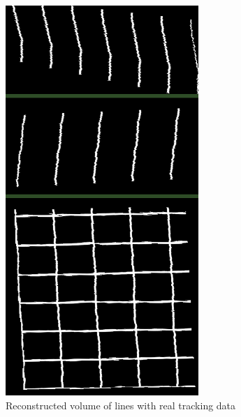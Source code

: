 \begin{figure}
\begin{minipage}[b]{0.49\textwidth}
	\includegraphics[width=0.652\textwidth]{graphics/large_lines.png}
	\caption{Reconstructed volume of lines with real tracking data}
	\label{fig:large_lines}
\end{minipage}
\end{figure}